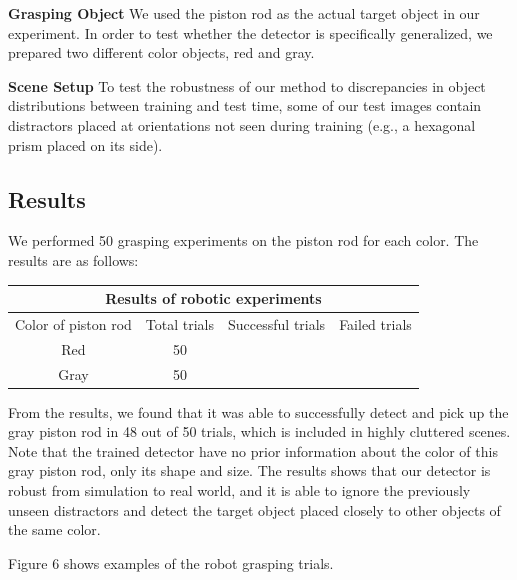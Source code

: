 \textbf{Grasping Object}
We used the piston rod as the actual target object in our experiment. In order to test whether the detector is specifically generalized, we prepared two different color objects, red and gray.

\textbf{Scene Setup}
To test the robustness of our method to discrepancies in object distributions between training and test time, some of our test images contain distractors placed at orientations not seen during training (e.g., a hexagonal prism placed on its side).

\subsection{Results}
We performed 50 grasping experiments on the piston rod for each color. The results are as follows:

\begin{table}[]
	\begin{tabular}{|c|c|c|c|}
		\hline
		\multicolumn{4}{|c|}{\textbf{Results of robotic experiments}} \\ \hline
		Color of piston rod & Total trials & Successful trials & Failed trials \\ \hline
		Red & 50 &  &  \\ \hline
		Gray & 50 &  &  \\ \hline
	\end{tabular}
\end{table}

From the results, we found that it was able to successfully detect and pick up the gray piston rod in 48 out of 50 trials, which is included in highly cluttered scenes. Note that the trained detector have no prior information about the color of this gray piston rod, only its shape and size. The results shows that our detector is robust from simulation to real world, and it is able to ignore the previously unseen distractors and detect the target object placed closely to other objects of the same color.

Figure 6 shows examples of the robot grasping trials.

\missingfigure{}
